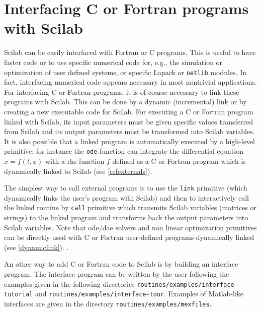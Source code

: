 
%

\chapter{Interfacing C or Fortran programs with Scilab}

Scilab can be easily interfaced with Fortran or C programs. 
This is useful to have faster code or to use specific numerical
code for, e.g., the simulation or optimization of
user defined systems, or specific Lapack or {\tt netlib} modules. 
In fact, interfacing numerical code appears necessary in most
nontrivial applications. For
interfacing C or Fortran programs, it is of course necessary to link
these programs with Scilab. This can be done by a dynamic
(incremental) link or by creating a new executable code for Scilab.
For executing a C or Fortran program linked with Scilab, its
input parameters must be given specific values transferred from Scilab
and its output
parameters must be transformed into Scilab variables.
It is also possible that a linked program is automatically executed
by a high-level primitive: for instance the {\tt ode} function
can integrate the differential equation $\dot{x} = f(t,x)$ with a
rhs function $f$ defined as a C or Fortran program which is
dynamically linked to Scilab (see \ref{refexternals}).


The simplest way to call external programs is to use the  
{\tt link} primitive
(which dynamically links the user's program with Scilab)
and then to interactively call
the linked routine by {\tt call} primitive
which transmits Scilab variables (matrices or strings) to the linked program
and transforms back the output parameters into Scilab variables. 
Note that ode/dae solvers and non linear optimization primitives
can be directly used with C or Fortran user-defined programs
dynamically linked (see \ref{dynamiclink}). . 

An other way to add C or Fortran code to Scilab is by 
building an interface program. The interface program can be written by
the user following the examples given in the following directories
{\tt routines/examples/interface-tutorial} and {\tt routines/examples/interface-tour}. Examples of Matlab-like interfaces are given in the directory
{\tt routines/examples/mexfiles}.

